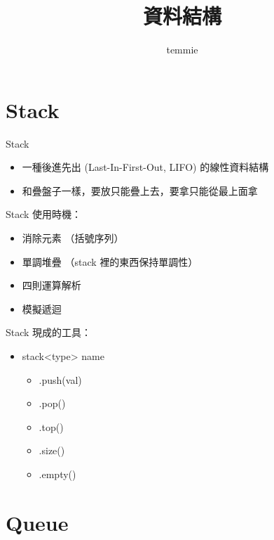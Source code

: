 \documentclass[mathserif]{beamer}
\title{資料結構}
\author{temmie}
\date{}
\begin{document}
\begin{frame}
    \titlepage
\end{frame}

\begin{frame}
    \tableofcontents
\end{frame}

\section{Stack}

\begin{frame}{Stack}
    \begin{itemize}
        \item 一種後進先出 (Last-In-First-Out, LIFO) 的線性資料結構
        \item 和疊盤子一樣，要放只能疊上去，要拿只能從最上面拿
    \end{itemize}
\end{frame}

\begin{frame}{Stack}
    使用時機：
    \begin{itemize}
        \item 消除元素 （括號序列）
        \item 單調堆疊 （stack 裡的東西保持單調性）
        \item 四則運算解析
        \item 模擬遞迴
    \end{itemize}
\end{frame}

\begin{frame}{Stack}
    現成的工具：
    \begin{itemize}
        \item stack<{\color{red}type}> {\color{red}name}
        \begin{itemize}
            \item .push({\color{red}val})
            \item .pop()
            \item .top()
            \item .size()
            \item .empty()
        \end{itemize}
    \end{itemize}
\end{frame}

\section{Queue}
\end{document}
